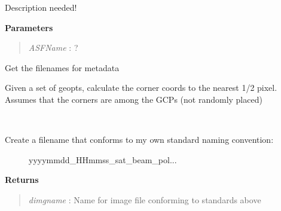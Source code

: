 \documentclass[letterpaper,10pt,english]{sphinxmanual}
\begin{document}
\begin{fulllineitems}
\begin{fulllineitems}
\end{fulllineitems}


\begin{fulllineitems}
\label{code:Metadata.Metadata.getASFProductType}
Description needed!

\textbf{Parameters}
\begin{quote}

\emph{ASFName} : ?
\end{quote}

\end{fulllineitems}


\begin{fulllineitems}
\label{code:Metadata.Metadata.getCEOSmetafile}
Get the filenames for metadata

\end{fulllineitems}


\begin{fulllineitems}
\label{code:Metadata.Metadata.getCornerPoints}
Given a set of geopts, calculate the corner coords to the nearest 1/2
pixel. Assumes that the corners are among the GCPs (not randomly placed)

\end{fulllineitems}


\begin{fulllineitems}
\label{code:Metadata.Metadata.getDimgname}~\begin{description}
\item[{Create a filename that conforms to my own standard naming convention:}] \leavevmode
yyyymmdd\_HHmmss\_sat\_beam\_pol...

\end{description}

\textbf{Returns}
\begin{quote}

\emph{dimgname} : Name for image file conforming to standards above
\end{quote}


\end{fulllineitems}
\end{fulllineitems}
\end{document}
